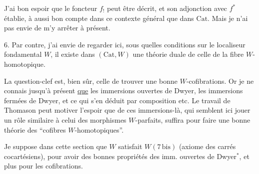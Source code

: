 J'ai bon espoir que  le foncteur $f_!$ peut être décrit, et son adjonction avec $f^*$ établie, à aussi bon compte dans ce contexte général que dans $\mathrm{Cat}$. Mais je n'ai pas envie de m'y arrêter à présent.

6. 
Par contre, j'ai envie de regarder ici,  sous quelles conditions sur le localiseur fondamental $W$, il existe dans $(\mathrm{Cat},W)$ une théorie duale de celle de la fibre $W$-homotopique.

La question-clef est, bien sûr, celle de  trouver une bonne  $W$-cofibrations. Or je ne connais jusqu'à présent \uline{que} les immersions ouvertes de Dwyer, les immersions fermées de Dwyer, et ce qui s'en déduit par composition etc. Le travail de Thomason peut motiver l'espoir que  de ces immersions-là, qui semblent ici jouer un rôle similaire  à celui des morphismes $W$-parfaits, suffira pour faire une bonne théorie des  ``cofibres $W$-homotopiques''.

Je suppose dans  cette section que $W$ satisfait $W(7\,\mathrm{bis})$ (axiome des carrés cocartésiens), pour avoir des bonnes propriétés des imm. ouvertes de Dwyer$^{*}$, et plus  pour les cofibrations.
